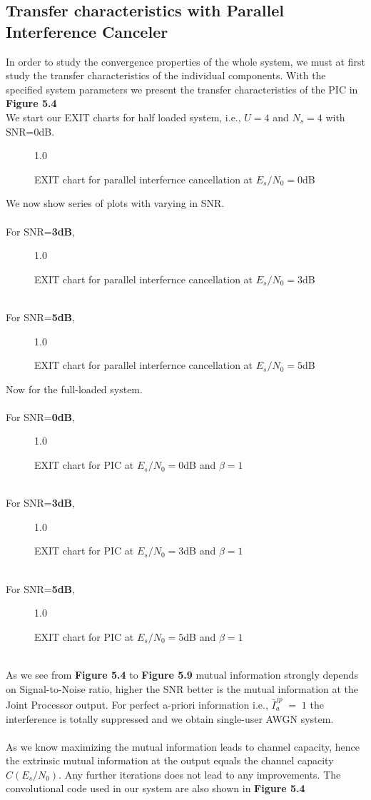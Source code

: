 \subsection{Transfer characteristics with Parallel Interference Canceler}
In order to study the convergence properties of the whole system, we must at first study the transfer characteristics of the individual components. With the specified system parameters we present the transfer characteristics of the PIC in \textbf{Figure 5.4} \\
We start our EXIT charts for half loaded system, i.e., $U=4$ and $N_s=4$ with SNR=0dB.
\begin{figure*}[htb]
\centerline{  {1.0}}
\caption{EXIT chart for parallel interfernce cancellation at $E_s/N_0=0$dB}
\end{figure*} 
\newpage
We now show series of plots with varying in SNR. \\ \\
For SNR=\textbf{3dB},
\begin{figure*}[htb]
\centerline{  {1.0}}
\caption{EXIT chart for parallel interfernce cancellation at $E_s/N_0=3$dB}
\end{figure*}\\
For SNR=\textbf{5dB},
\begin{figure*}[htb]
\centerline{  {1.0}}
\caption{EXIT chart for parallel interfernce cancellation at $E_s/N_0=5$dB}
\end{figure*}
\newpage
Now for the full-loaded system.\\\\
For SNR=\textbf{0dB},
\begin{figure*}[htb]
\centerline{  {1.0}}
\caption{EXIT chart for PIC at $E_s/N_0=0$dB and $\beta=1$}
\end{figure*}\\
For SNR=\textbf{3dB},
\begin{figure*}[htb]
\centerline{  {1.0}}
\caption{EXIT chart for PIC at $E_s/N_0=3$dB and $\beta=1$}
\end{figure*}\\
\newpage
For SNR=\textbf{5dB},
\begin{figure*}[htb]
\centerline{  {1.0}}
\caption{EXIT chart for PIC at $E_s/N_0=5$dB and $\beta=1$}
\end{figure*}\\
As we see from \textbf{Figure 5.4} to \textbf{Figure 5.9} mutual information strongly depends on Signal-to-Noise ratio, higher the SNR better is the mutual information at the Joint Processor output. For perfect a-priori information i.e., $\bar{I}_a^{jp}\;=\;1$ the interference is totally suppressed and we obtain single-user AWGN system.\\ \\
As we know maximizing the mutual information leads to channel capacity, hence the extrinsic mutual information at the output equals the channel capacity $C(E_s/N_0)$. Any further iterations does not lead to any improvements.
The convolutional code used in our system are also shown in \textbf{Figure 5.4}
\newpage
